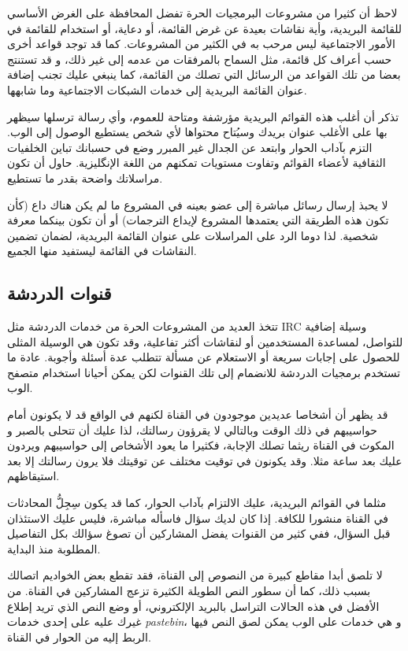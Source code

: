 لاحظ أن كثيرا من مشروعات البرمجيات الحرة تفضل المحافظة على الغرض الأساسي
للقائمة البريدية، وأية نقاشات بعيدة عن غرض القائمة، أو دعاية، أو
استخدام للقائمة في الأمور الاجتماعية ليس مرحب به في الكثير من
المشروعات. كما قد توجد قواعد أخرى حسب أعراف كل قائمة، مثل السماح
بالمرفقات من عدمه إلى غير ذلك، و قد تستنتج بعضا من تلك القواعد من
الرسائل التي تصلك من القائمة، كما ينبغي عليك تجنب إضافة عنوان القائمة
البريدية إلى خدمات الشبكات الاجتماعية وما شابهها.

تذكر أن أغلب هذه القوائم البريدية مؤرشفة ومتاحة للعموم، وأي رسالة ترسلها
سيظهر بها على الأغلب عنوان بريدك وسيُتاح محتواها لأي شخص يستطيع الوصول
إلى الوب. التزم بآداب الحوار وابتعد عن الجدال غير المبرر وضع في حسبانك
تباين الخلفيات الثقافية لأعضاء القوائم وتفاوت مستويات تمكنهم من اللغة
الإنگليزية. حاول أن تكون مراسلاتك واضحة بقدر ما تستطيع.

لا يحبذ إرسال رسائل مباشرة إلى عضو بعينه في المشروع ما لم يكن هناك داع
(كأن تكون هذه الطريقة التي يعتمدها المشروع لإيداع الترجمات) أو أن تكون
بينكما معرفة شخصية. لذا دوما الرد على المراسلات على عنوان القائمة
البريدية، لضمان تضمين النقاشات في القائمة ليستفيد منها الجميع.

\subsection{قنوات الدردشة}
تتخذ العديد من المشروعات الحرة من خدمات الدردشة مثل IRC وسيلة إضافية
للتواصل، لمساعدة المستخدمين أو لنقاشات أكثر تفاعلية، وقد تكون هي
الوسيلة المثلى للحصول على إجابات سريعة أو الاستعلام عن مسألة تتطلب عدة
أسئلة وأجوبة. عادة ما تستخدم برمجيات الدردشة للانضمام إلى تلك القنوات
لكن يمكن أحيانا استخدام متصفح الوب.

قد يظهر أن أشخاصا عديدين موجودون في القناة لكنهم في الواقع قد لا يكونون
أمام حواسيبهم في ذلك الوقت وبالتالي لا يقرؤون رسالتك، لذا عليك أن تتحلى
بالصبر و المكوث في القناة ريثما تصلك الإجابة، فكثيرا ما يعود الأشخاص
إلى حواسيبهم ويردون عليك بعد ساعة مثلا. وقد يكونون في توقيت مختلف عن
توقيتك فلا يرون رسالتك إلا بعد استيقاظهم.

مثلما في القوائم البريدية، عليك الالتزام بآداب الحوار، كما قد يكون
سِجِلُّ المحادثات في القناة منشورا للكافة. إذا كان لديك سؤال فاسأله
مباشرة، فليس عليك الاستئذان قبل السؤال، ففي كثير من القنوات يفضل
المشاركين أن تصوغ سؤالك بكل التفاصيل المطلوبة منذ البداية.

لا تلصق أبدا مقاطع كبيرة من النصوص إلى القناة، فقد تقطع بعض الخواديم
اتصالك بسبب ذلك، كما أن سطور النص الطويلة الكثيرة تزعج المشاركين في
القناة. من الأفضل في هذه الحالات التراسل بالبريد الإلكتروني، أو وضع
النص الذي تريد إطلاع غيرك عليه على إحدى خدمات {\it pastebin}، و هي
خدمات على الوب يمكن لصق النص فيها الربط إليه من الحوار في القناة.

